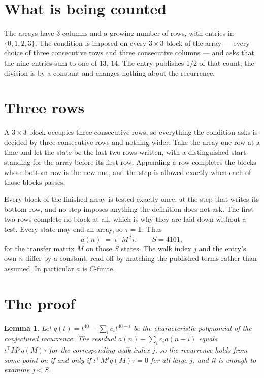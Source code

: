 \documentclass[11pt,a4paper]{article}
\theoremstyle{plain}
\newtheorem{lemma}[theorem]{Lemma}
\theoremstyle{definition}
\begin{document}
\section{What is being counted}

The arrays have $3$ columns and a growing number of rows, with entries in $\{0,1,2,3\}$. The
condition is imposed on every $3\times3$ block of the array --- every choice of three
consecutive rows and three consecutive columns --- and asks that the nine entries sum to one of $13,\,14$. The entry publishes $1/2$ of that count; the division is by a constant and changes nothing about the recurrence.



\section{Three rows}

A $3\times3$ block occupies three consecutive rows, so everything the condition asks is decided
by three consecutive rows and nothing wider. Take the array one row at a time and let the state
be the last two rows written, with a distinguished start standing for the array before its
first row. Appending a row completes the blocks whose bottom row is the new one, and the step
is allowed exactly when each of those blocks passes.

Every block of the finished array is tested exactly once, at the step that writes its bottom
row, and no step imposes anything the definition does not ask. The first two rows complete no
block at all, which is why they are laid down without a test. Every state may end an array, so
$\tau=\mathbf{1}$. Thus
\[
a(n)\;=\;\iota^{\!\top}M^{\,j}\tau ,\qquad S=4161,
\]
for the transfer matrix $M$ on those $S$ states. The walk index $j$ and the entry's own $n$
differ by a constant, read off by matching the published terms rather than assumed. In
particular $a$ is $C$-finite.

\section{The proof}

\begin{lemma}\label{lem:crit}
Let $q(t)=t^{40}-\sum_i c_it^{40-i}$ be the characteristic polynomial of the
conjectured recurrence. The residual $a(n)-\sum_ic_ia(n-i)$ equals
$\iota^{\!\top}M^{\,j}q(M)\tau$ for the corresponding walk index $j$, so the recurrence
holds from some point on if and only if $\iota^{\!\top}M^{j}q(M)\tau=0$ for all large $j$,
and it is enough to examine $j<S$.
\end{lemma}
\end{document}
